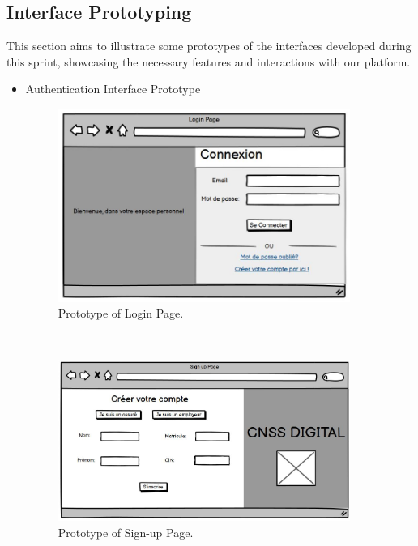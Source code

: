 \subsection{Interface Prototyping}
This section aims to illustrate some prototypes of the interfaces developed during this sprint, showcasing the necessary features and interactions with our platform.
\begin{itemize}
    \item Authentication Interface Prototype
    \begin{figure}[h]
    \centering
    \includegraphics[width=0.9\textwidth]{figures/login.JPG}  %
    \caption{Prototype of Login Page.}
\end{figure}\
\begin{figure}[h]
    \centering
    \includegraphics[width=0.9\textwidth]{figures/signup.JPG}  %
    \caption{Prototype of Sign-up Page.}
\end{figure}\
\end{itemize}
\clearpage
